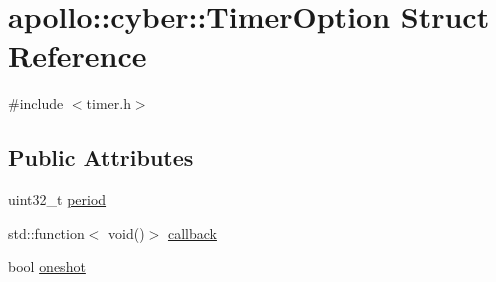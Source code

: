 \hypertarget{structapollo_1_1cyber_1_1TimerOption}{\section{apollo\-:\-:cyber\-:\-:Timer\-Option Struct Reference}
\label{structapollo_1_1cyber_1_1TimerOption}
}


{\ttfamily \#include $<$timer.\-h$>$}

\subsection*{Public Attributes}
\begin{DoxyCompactItemize}
\item 
uint32\-\_\-t \hyperlink{structapollo_1_1cyber_1_1TimerOption_a1396276508eb65076ffad3b8490118e8}{period}
\item 
std\-::function$<$ void()$>$ \hyperlink{structapollo_1_1cyber_1_1TimerOption_af36f1413cc8bc74335906347c90d22f3}{callback}
\item 
bool \hyperlink{structapollo_1_1cyber_1_1TimerOption_abbadf97fc595abb13d5a8eccb6151487}{oneshot}
\end{DoxyCompactItemize}



